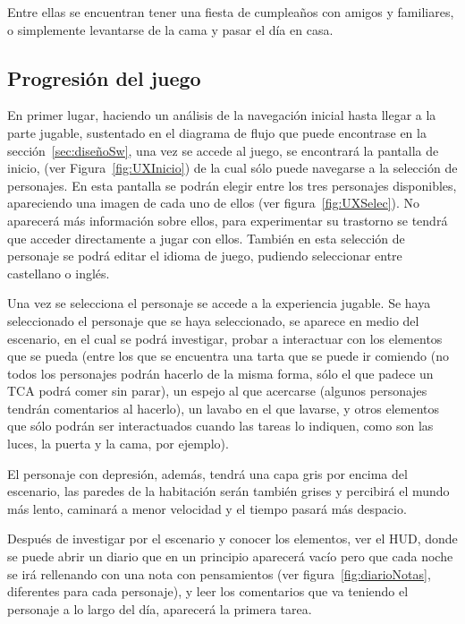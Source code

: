 \documentclass[12pt, a4paper,twoside,titlepage]{book}
\begin{document}
Entre ellas se encuentran tener una fiesta de cumpleaños con amigos y familiares, o simplemente levantarse de la cama y pasar el día en casa. 

\subsection{Progresión del juego}
En primer lugar, haciendo un análisis de la navegación inicial hasta llegar a la parte jugable, sustentado en el diagrama de flujo que puede encontrase en la sección~\ref{sec:diseñoSw}, una vez se accede al juego, se encontrará la pantalla de inicio, (ver Figura~\ref{fig:UXInicio}) de la cual sólo puede navegarse a la selección de personajes. En esta pantalla se podrán elegir entre los tres personajes disponibles, apareciendo una imagen de cada uno de ellos (ver figura~\ref{fig:UXSelec}). No aparecerá más información sobre ellos, para experimentar su trastorno se tendrá que acceder directamente a jugar con ellos. También en esta selección de personaje se podrá editar el idioma de juego, pudiendo seleccionar entre castellano o inglés. 

Una vez se selecciona el personaje se accede a la experiencia jugable. Se haya seleccionado el personaje que se haya seleccionado, se aparece en medio del escenario, en el cual se podrá investigar, probar a interactuar con los elementos que se pueda (entre los que se encuentra una tarta que se puede ir comiendo (no todos los personajes podrán hacerlo de la misma forma, sólo el que padece un TCA podrá comer sin parar), un espejo al que acercarse (algunos personajes tendrán comentarios al hacerlo), un lavabo en el que lavarse, y otros elementos que sólo podrán ser interactuados cuando las tareas lo indiquen, como son las luces, la puerta y la cama, por ejemplo). 

El personaje con depresión, además, tendrá una capa gris por encima del escenario, las paredes de la habitación serán también grises y percibirá el mundo más lento, caminará a menor velocidad y el tiempo pasará más despacio. 

Después de investigar por el escenario y conocer los elementos, ver el HUD, donde se puede abrir un diario que en un principio aparecerá vacío pero que cada noche se irá rellenando con una nota con pensamientos (ver figura~\ref{fig:diarioNotas}, diferentes para cada personaje), y leer los comentarios que va teniendo el personaje a lo largo del día, aparecerá la primera tarea. 
\end{document}
